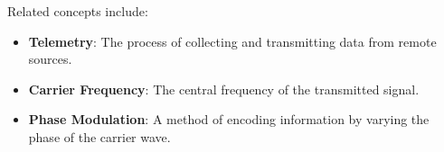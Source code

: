Related concepts include:
\begin{itemize}
    \item \textbf{Telemetry}: The process of collecting and transmitting data from remote sources.
    \item \textbf{Carrier Frequency}: The central frequency of the transmitted signal.
    \item \textbf{Phase Modulation}: A method of encoding information by varying the phase of the carrier wave.
\end{itemize}

